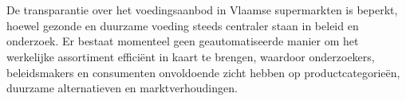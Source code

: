 
%
%
%
%
%

%



\chapter*{}

De transparantie over het voedingsaanbod in Vlaamse supermarkten is beperkt, hoewel gezonde en duurzame voeding steeds centraler staan in beleid en onderzoek. 
Er bestaat momenteel geen geautomatiseerde manier om het werkelijke assortiment efficiënt in kaart te brengen, waardoor onderzoekers, beleidsmakers en consumenten onvoldoende zicht hebben op productcategorieën, duurzame alternatieven en marktverhoudingen.

